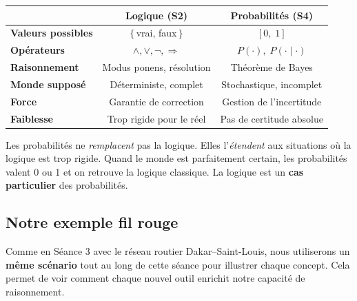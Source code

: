\documentclass[11pt,a4paper]{article}
\begin{document}
\begin{retenirbox}
\begin{center}
\begin{tabular}{lcc}
\toprule
& \textbf{Logique (S2)} & \textbf{Probabilités (S4)} \\
\midrule
\textbf{Valeurs possibles} & $\{$\,vrai, faux\,$\}$ & $[0, \; 1]$ \\
\textbf{Opérateurs} & $\land, \lor, \neg, \Rightarrow$ & $P(\cdot), \; P(\cdot \mid \cdot)$ \\
\textbf{Raisonnement} & Modus ponens, résolution & Théorème de Bayes \\
\textbf{Monde supposé} & Déterministe, complet & Stochastique, incomplet \\
\textbf{Force} & Garantie de correction & Gestion de l'incertitude \\
\textbf{Faiblesse} & Trop rigide pour le réel & Pas de certitude absolue \\
\bottomrule
\end{tabular}
\end{center}

Les probabilités ne \textit{remplacent} pas la logique. Elles l'\textit{étendent} aux situations où la logique est trop rigide. Quand le monde est parfaitement certain, les probabilités valent 0 ou 1 et on retrouve la logique classique. La logique est un \textbf{cas particulier} des probabilités.
\end{retenirbox}

\subsection{Notre exemple fil rouge}

Comme en Séance 3 avec le réseau routier Dakar--Saint-Louis, nous utiliserons un \textbf{même scénario} tout au long de cette séance pour illustrer chaque concept. Cela permet de voir comment chaque nouvel outil enrichit notre capacité de raisonnement.
\end{document}
